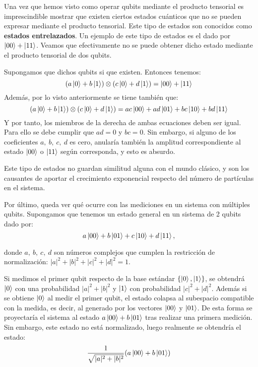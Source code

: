 Una vez que hemos visto como operar qubits mediante el producto tensorial es imprescindible mostrar que existen ciertos estados cuánticos que no se pueden expresar mediante el producto tensorial. Este tipo de estados son conocidos como \textbf{estados entrelazados}. Un ejemplo de este tipo de estados es el dado por $\left|00\right\rangle + \left|11\right\rangle$. Veamos que efectivamente no se puede obtener dicho estado mediante el producto tensorial de dos qubits.

Supongamos que dichos qubits si que existen. Entonces tenemos:
\begin{equation}
(a\left|0\right\rangle + b\left|1\right\rangle)\otimes (c\left|0\right\rangle + d\left|1\right\rangle) = \left|00\right\rangle + \left|11\right\rangle
\end{equation}
Además, por lo visto anteriormente se tiene también que:
\begin{equation}
(a\left|0\right\rangle + b\left|1\right\rangle)\otimes (c\left|0\right\rangle + d\left|1\right\rangle) = ac\left|00\right\rangle + ad\left|01\right\rangle + bc\left|10\right\rangle + bd\left|11\right\rangle
\end{equation}
Y por tanto, los miembros de la derecha de ambas ecuaciones deben ser igual. Para ello se debe cumplir que $ ad = 0$ y $bc=0$. Sin embargo, si alguno de los coeficientes $a,\ b,\ c,\ d$ es cero, anularía  también la amplitud correspondiente al estado $\left|00\right\rangle$ o $\left|11\right\rangle$ según corresponda, y esto es absurdo.

Este tipo de estados no guardan similitud alguna con el mundo clásico, y son los causantes de aportar el crecimiento exponencial respecto del número de partículas en el sistema.

Por último, queda ver qué ocurre con las mediciones en un sistema con múltiples qubits. Supongamos que tenemos un estado general en un sistema de 2 qubits dado por:
\begin{equation}
a\left|00\right\rangle + b\left|01\right\rangle + c\left|10\right\rangle + d\left|11\right\rangle, 
\end{equation}

donde $a,\ b,\ c,\ d$ son números complejos que cumplen la restricción de normalización: $|a|^2 + |b|^2 + |c|^2 + |d|^2 = 1$.

Si medimos el primer qubit respecto de la base estándar $\{\left|0\right\rangle,\left|1\right\rangle\}$, se obtendrá $\left|0\right\rangle$ con una probabilidad $|a|^2 + |b|^2$ y $\left|1\right\rangle$ con probabilidad $|c|^2 + |d|^2$. Además si se obtiene $\left|0\right\rangle$ al medir el primer qubit, el estado colapsa al subespacio compatible con la medida, es decir, al generado por los vectores $\left|00\right\rangle$ y $\left|01\right\rangle$. De esta forma se proyectaría el sistema al estado  $a\left|00\right\rangle + b\left|01\right\rangle$ tras realizar una primera medición. Sin embargo, este estado no está normalizado, luego realmente se obtendría el estado: 
\begin{equation}
\dfrac{1}{\sqrt{|a|^2 + |b|^2}}(a\left|00\right\rangle + b\left|01\right\rangle)
\end{equation}

